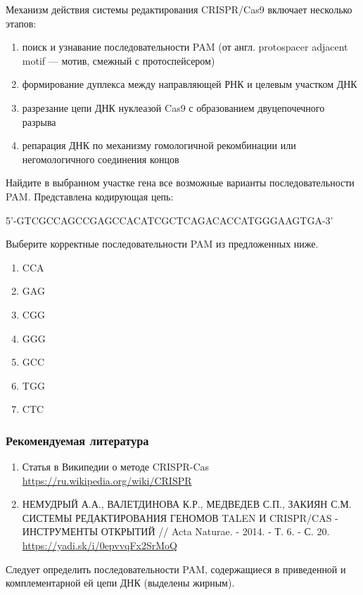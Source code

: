 
Механизм действия системы редактирования CRISPR/Cas9 включает несколько этапов:

\begin{enumerate}
    \item поиск и узнавание последовательности PAM (от англ. protospacer adjacent motif — мотив, смежный с протоспейсером)
    \item формирование дуплекса между направляющей РНК и целевым участком ДНК
    \item разрезание цепи ДНК нуклеазой Cas9 с образованием двуцепочечного разрыва
    \item репарация ДНК по механизму гомологичной рекомбинации или негомологичного соединения концов
\end{enumerate}

Найдите в выбранном участке гена все возможные варианты последовательности PAM. Представлена кодирующая цепь:

5'-GTCGCCAGCCGAGCCACATCGCTCAGACACCATGGGAAGTGA-3'

Выберите корректные последовательности PAM из предложенных ниже.

\begin{enumerate}
    \item CCA
    \item GAG
    \item CGG
    \item GGG
    \item GCC
    \item TGG
    \item CTC
\end{enumerate}

\subsubsection*{Рекомендуемая литература}

\begin{enumerate}
    \item Статья в Википедии о методе CRISPR-Cas \url{https://ru.wikipedia.org/wiki/CRISPR}
    \item НЕМУДРЫЙ А.А., ВАЛЕТДИНОВА К.Р., МЕДВЕДЕВ С.П., ЗАКИЯН С.М. СИСТЕМЫ РЕДАКТИРОВАНИЯ ГЕНОМОВ TALEN И CRISPR/CAS - ИНСТРУМЕНТЫ ОТКРЫТИЙ // Acta Naturae. - 2014. - Т. 6. - С. 20.  \url{https://yadi.sk/i/0epvvqFx2SrMoQ} 
\end{enumerate}

\explanationSection

Следует определить последовательности PAM, содержащиеся в приведенной и комплементарной ей цепи ДНК (выделены жирным).

